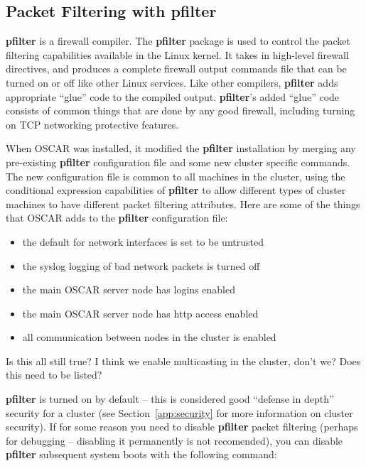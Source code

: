 %
%
%

\subsection{Packet Filtering with pfilter}
\label{app:pfilter-overview}

{\bf pfilter} is a firewall compiler.  The {\bf pfilter} package is
used to control the packet filtering capabilities available in the
Linux kernel.  It takes in high-level firewall directives, and
produces a complete firewall output commands file that can be turned
on or off like other Linux services.  Like other compilers, {\bf
  pfilter} adds appropriate ``glue'' code to the compiled output.
{\bf pfilter}'s added ``glue'' code consists of common things that are
done by any good firewall, including turning on TCP networking
protective features.

When OSCAR was installed, it modified the {\bf pfilter} installation
by merging any pre-existing {\bf pfilter} configuration file and some
new cluster specific commands.  The new configuration file is common
to all machines in the cluster, using the conditional expression
capabilities of {\bf pfilter} to allow different types of cluster
machines to have different packet filtering attributes.  
Here are some of the things that OSCAR adds
to the {\bf pfilter} configuration file:

\begin{itemize}
\item the default for network interfaces is set to be untrusted
\item the syslog logging of bad network packets is turned off
\item the main OSCAR server node has  logins enabled
\item the main OSCAR server node has http access enabled
\item all communication between nodes in the cluster is enabled
\end{itemize}

\begin{discuss}
  Is this all still true?  I think we enable multicasting in the
  cluster, don't we?  Does this need to be listed?
\end{discuss}

{\bf pfilter} is turned on by default -- this is considered good
``defense in depth'' security for a cluster (see
Section~\ref{app:security} for more information on cluster security).
If for some reason you need to disable {\bf pfilter} packet filtering
(perhaps for debugging -- disabling it permanently is not recomended),
you can disable {\bf pfilter} subsequent system boots with the
following command:

